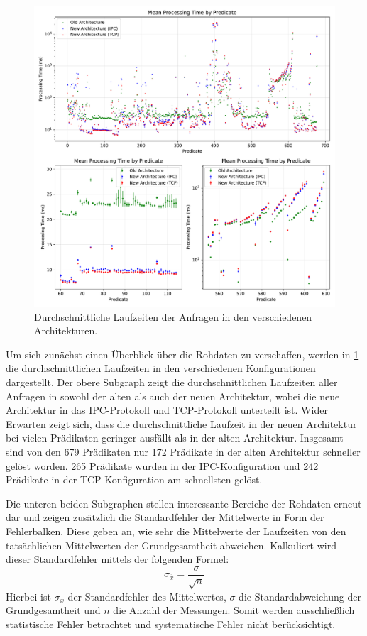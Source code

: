 \begin{figure}[!htp]
    \centering
    \includegraphics[scale=.55]{./PerformanceEvaluation/processingtime.pdf}
    \caption{Durchschnittliche Laufzeiten der Anfragen in den verschiedenen Architekturen.}
    \label{fig:performance-overview}
\end{figure}
\FloatBarrier

Um sich zunächst einen Überblick über die Rohdaten zu verschaffen,
werden in \cref{fig:performance-overview} die durchschnittlichen Laufzeiten in den verschiedenen Konfigurationen dargestellt.
Der obere Subgraph zeigt die durchschnittlichen Laufzeiten aller Anfragen in sowohl der alten als auch der neuen Architektur,
wobei die neue Architektur in das IPC-Protokoll und TCP-Protokoll unterteilt ist.
Wider Erwarten zeigt sich, dass die durchschnittliche Laufzeit in der neuen Architektur bei vielen Prädikaten geringer ausfällt als in der alten Architektur.
Insgesamt sind von den 679 Prädikaten nur 172 Prädikate in der alten Architektur schneller gelöst worden.
265 Prädikate wurden in der IPC-Konfiguration und 242 Prädikate in der TCP-Konfiguration am schnellsten gelöst.

Die unteren beiden Subgraphen stellen interessante Bereiche der Rohdaten erneut dar und zeigen zusätzlich
die Standardfehler der Mittelwerte in Form der Fehlerbalken. Diese geben an, wie sehr die
Mittelwerte der Laufzeiten von den tatsächlichen Mittelwerten der Grundgesamtheit abweichen.
Kalkuliert wird dieser Standardfehler mittels der folgenden Formel:
\begin{equation}
    \sigma_{\overline{x}} = \frac{\sigma}{\sqrt{n}}
\end{equation}
Hierbei ist $\sigma_{\overline{x}}$ der Standardfehler des Mittelwertes, $\sigma$ die Standardabweichung der Grundgesamtheit und $n$ die Anzahl der Messungen.
Somit werden ausschließlich statistische Fehler betrachtet und systematische Fehler nicht berücksichtigt.


